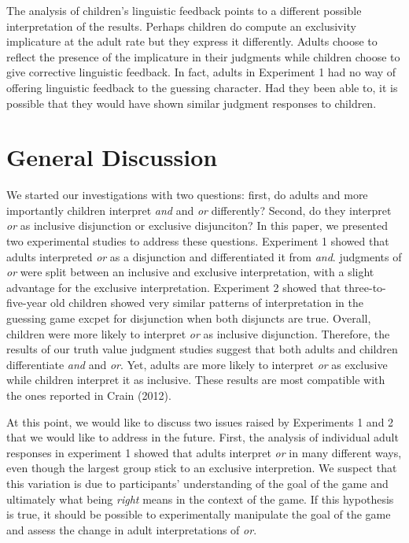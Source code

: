 \documentclass[10pt, letterpaper]{article}
\begin{document}
The analysis of children's linguistic feedback points to a different
possible interpretation of the results. Perhaps children do compute an
exclusivity implicature at the adult rate but they express it
differently. Adults choose to reflect the presence of the implicature in
their judgments while children choose to give corrective linguistic
feedback. In fact, adults in Experiment 1 had no way of offering
linguistic feedback to the guessing character. Had they been able to, it
is possible that they would have shown similar judgment responses to
children.

\section{General Discussion}\label{general-discussion}

We started our investigations with two questions: first, do adults and
more importantly children interpret \emph{and} and \emph{or}
differently? Second, do they interpret \emph{or} as inclusive
disjunction or exclusive disjunciton? In this paper, we presented two
experimental studies to address these questions. Experiment 1 showed
that adults interpreted \emph{or} as a disjunction and differentiated it
from \emph{and}. judgments of \emph{or} were split between an inclusive
and exclusive interpretation, with a slight advantage for the exclusive
interpretation. Experiment 2 showed that three-to-five-year old children
showed very similar patterns of interpretation in the guessing game
excpet for disjunction when both disjuncts are true. Overall, children
were more likely to interpret \emph{or} as inclusive disjunction.
Therefore, the results of our truth value judgment studies suggest that
both adults and children differentiate \emph{and} and \emph{or}. Yet,
adults are more likely to interpret \emph{or} as exclusive while
children interpret it as inclusive. These results are most compatible
with the ones reported in Crain (2012).

At this point, we would like to discuss two issues raised by Experiments
1 and 2 that we would like to address in the future. First, the analysis
of individual adult responses in experiment 1 showed that adults
interpret \emph{or} in many different ways, even though the largest
group stick to an exclusive interpretion. We suspect that this variation
is due to participants' understanding of the goal of the game and
ultimately what being \emph{right} means in the context of the game. If
this hypothesis is true, it should be possible to experimentally
manipulate the goal of the game and assess the change in adult
interpretations of \emph{or}.
\end{document}
